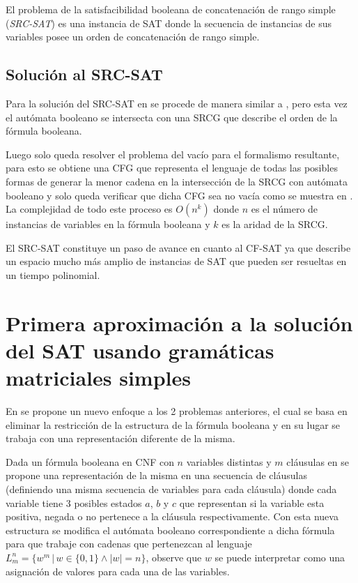 \documentclass{article}
\begin{document}
El problema de la satisfacibilidad booleana de concatenación de rango simple (\textit{SRC-SAT}) es una instancia de
SAT donde la secuencia de instancias de sus variables posee un orden de concatenación de rango simple.

\subsection{Solución al SRC-SAT}

Para la solución del SRC-SAT en \cite{aSRCSAT} se procede de manera similar a \cite{aCFSAT}, pero esta vez el autómata
booleano se intersecta con una SRCG que describe el orden de la fórmula booleana.

Luego solo queda resolver el problema del vacío para el formalismo resultante, para esto se obtiene una CFG
que representa el lenguaje de todas las posibles formas de generar la menor cadena en la intersección de la SRCG
con autómata booleano y solo queda verificar que dicha CFG sea no vacía como se muestra en \cite{aCFSAT}. La complejidad
de todo este proceso es $O(n^k)$ donde $n$ es el número de instancias de variables en la fórmula booleana y $k$ es
la aridad de la SRCG.

El SRC-SAT constituye un paso de avance en cuanto al CF-SAT ya que describe un espacio mucho más amplio de instancias de SAT
que pueden ser resueltas en un tiempo polinomial.

\section{Primera aproximación a la solución del SAT usando gramáticas matriciales simples}

En \cite{aSMSAT} se propone un nuevo enfoque a los 2 problemas anteriores, el cual se basa en eliminar la restricción
de la estructura de la fórmula booleana y en su lugar se trabaja con una representación diferente de la misma.

Dada un fórmula booleana en CNF con $n$ variables distintas y $m$ cláusulas en \cite{aSMSAT} se propone una representación de la misma
en una secuencia de cláusulas (definiendo una misma secuencia de variables para cada cláusula) donde cada variable tiene
3 posibles estados $a$, $b$ y $c$ que representan si la variable esta positiva, negada o no pertenece a la cláusula
respectivamente. Con esta nueva estructura se modifica el autómata booleano correspondiente a dicha fórmula para que trabaje con
cadenas que pertenezcan al lenguaje $L^n_m=\{w^m\,|\,w\in\{0,1\} \wedge |w|=n\}$, observe que $w$ se puede interpretar como una
asignación de valores para cada una de las variables.
\end{document}

